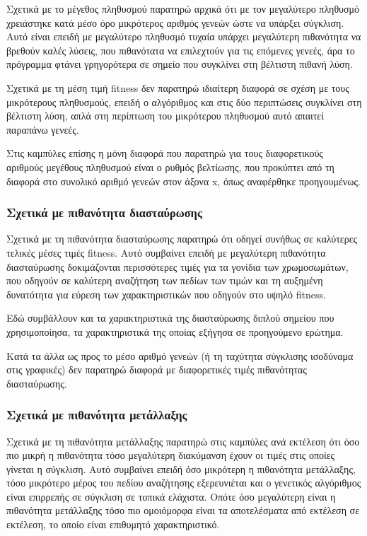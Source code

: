 \documentclass[12pt,a4paper]{article}
\begin{document}
Σχετικά με το μέγεθος πληθυσμού παρατηρώ αρχικά ότι με τον μεγαλύτερο πληθυσμό χρειάστηκε κατά μέσο όρο μικρότερος αριθμός γενεών ώστε να υπάρξει σύγκλιση. Αυτό είναι επειδή με μεγαλύτερο πληθυσμό τυχαία υπάρχει μεγαλύτερη πιθανότητα να βρεθούν καλές λύσεις, που πιθανότατα να επιλεχτούν για τις επόμενες γενεές, άρα το πρόγραμμα φτάνει γρηγορότερα σε σημείο που συγκλίνει στη βέλτιστη πιθανή λύση.

Σχετικά με τη μέση τιμή fitness δεν παρατηρώ ιδιαίτερη διαφορά σε σχέση με τους μικρότερους πληθυσμούς, επειδή ο αλγόριθμος και στις δύο περιπτώσεις συγκλίνει στη βέλτιστη λύση, απλά στη περίπτωση του μικρότερου πληθυσμού αυτό απαιτεί παραπάνω γενεές.

Στις καμπύλες επίσης η μόνη διαφορά που παρατηρώ για τους διαφορετικούς αριθμούς μεγέθους πληθυσμού είναι ο ρυθμός βελτίωσης, που προκύπτει από τη διαφορά στο συνολικό αριθμό γενεών στον άξονα x, όπως αναφέρθηκε προηγουμένως.

\subsubsection{Σχετικά με πιθανότητα διασταύρωσης}

Σχετικά με τη πιθανότητα διασταύρωσης παρατηρώ ότι οδηγεί συνήθως σε καλύτερες τελικές μέσες τιμές fitness. Αυτό συμβαίνει επειδή με μεγαλύτερη πιθανότητα διασταύρωσης δοκιμάζονται περισσότερες τιμές για τα γονίδια των χρωμοσωμάτων, που οδηγούν σε καλύτερη αναζήτηση των πεδίων των τιμών και τη αυξημένη δυνατότητα για εύρεση των χαρακτηριστικών που οδηγούν στο υψηλό fitness.

Εδώ συμβάλλουν και τα χαρακτηριστικά της διασταύρωσης διπλού σημείου που χρησιμοποίησα, τα χαρακτηριστικά της οποίας εξήγησα σε προηγούμενο ερώτημα.

Κατά τα άλλα ως προς το μέσο αριθμό γενεών (ή τη ταχύτητα σύγκλισης ισοδύναμα στις γραφικές) δεν παρατηρώ διαφορά με διαφορετικές τιμές πιθανότητας διασταύρωσης.

\subsubsection{Σχετικά με πιθανότητα μετάλλαξης}

Σχετικά με τη πιθανότητα μετάλλαξης παρατηρώ στις καμπύλες ανά εκτέλεση ότι όσο πιο μικρή η πιθανότητα τόσο μεγαλύτερη διακύμανση έχουν οι τιμές στις οποίες γίνεται η σύγκλιση. Αυτό συμβαίνει επειδή όσο μικρότερη η πιθανότητα μετάλλαξης, τόσο μικρότερο μέρος του πεδίου αναζήτησης εξερευνιέται και ο γενετικός αλγόριθμος είναι επιρρεπής σε σύγκλιση σε τοπικά ελάχιστα. Οπότε όσο μεγαλύτερη είναι η πιθανότητα μετάλλαξης τόσο πιο ομοιόμορφα είναι τα αποτελέσματα από εκτέλεση σε εκτέλεση, το οποίο είναι επιθυμητό χαρακτηριστικό.
\end{document}
